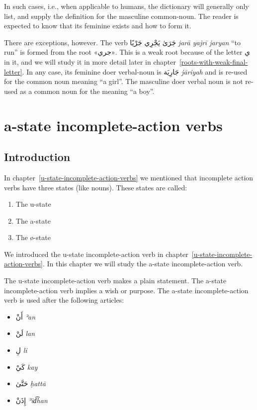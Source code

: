 \documentclass[
  10pt,
]{book}
\providecommand{\tightlist}{%
  \setlength{\itemsep}{0pt}\setlength{\parskip}{0pt}}
\begin{document}
In such cases, i.e., when applicable to humans, the dictionary will generally only list, and supply the definition for the masculine common-noun. The reader is expected to know that its feminine exists and how to form it.

There are exceptions, however. The verb \foreignlanguage{arabic}{جَرَىٰ يَجْرِي جَرْيًا} \emph{jarā yajrī jaryan} \enquote{to run} is formed from the root \foreignlanguage{arabic}{«جري»}. This is a weak root because of the letter \foreignlanguage{arabic}{ي} in it, and we will study it in more detail later in chapter~\ref{roots-with-weak-final-letter}. In any case, its feminine doer verbal-noun is \foreignlanguage{arabic}{جَارِيَة} \emph{jāriyah} and is re-used for the common noun meaning \enquote{a girl}. The masculine doer verbal noun is not re-used as a common noun for the meaning \enquote{a boy}.

\chapter{a-state incomplete-action verbs}\label{a-state-incomplete-action-verbs}

\section{Introduction}\label{introduction-18}

In
chapter~\ref{u-state-incomplete-action-verbs}
we mentioned that incomplete action verbs have three states (like nouns).
These states are called:

\begin{enumerate}
\def\labelenumi{\roman{enumi}.}
\tightlist
\item
  The u-state
\item
  The a-state
\item
  The ø-state
\end{enumerate}

We introduced the u-state incomplete-action verb in
chapter~\ref{u-state-incomplete-action-verbs}.
In this chapter we will study the
a-state
incomplete-action verb.

The u-state incomplete-action verb makes a plain statement.
The a-state incomplete-action verb implies a wish or purpose.
The a-state incomplete-action verb is used after the following articles:

\begin{itemize}
\tightlist
\item
  \foreignlanguage{arabic}{أَنْ} \emph{ʾan}
\item
  \foreignlanguage{arabic}{لَنْ} \emph{lan}
\item
  \foreignlanguage{arabic}{لِ} \emph{li}
\item
  \foreignlanguage{arabic}{کَيْ} \emph{kay}
\item
  \foreignlanguage{arabic}{حَتَّىٰ} \emph{ḥattā}
\item
  \foreignlanguage{arabic}{إِذَنْ} \emph{ʾid͡han}
\end{itemize}
\end{document}

